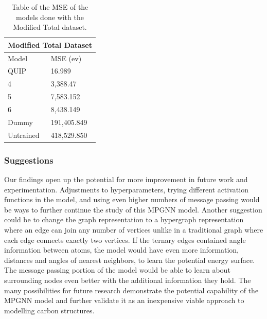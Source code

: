 \documentclass[12pt, abstract = true]{scrartcl}
\begin{document}
\begin{table}
    \centering
    \begin{tabular}{p{3cm}|p{2.5cm}}
    \hline
    \multicolumn{2}{|c|}{Modified Total Dataset} \\
    \hline
    Model  & MSE (ev)\\
    \hline
    QUIP   & 16.989 \\
    4   & 3,388.47 \\
    5 & 7,583.152 \\
    6    & 8,438.149\\
    Dummy & 191,405.849 \\
    Untrained & 418,529.850\\
    \hline
    \end{tabular}
    \caption{Table of the MSE of the models done with the Modified Total dataset.}\label{tab:total}
\end{table}


\subsubsection{Suggestions} 

Our findings open up the potential for more improvement in future work and experimentation. Adjustments to hyperparameters, trying different activation functions in the model, and using even higher numbers of message passing would be ways to further continue the study of this MPGNN model. Another suggestion could be to change the graph representation to a hypergraph representation where an edge can join any number of vertices unlike in a traditional graph where each edge connects exactly two vertices. If the ternary edges contained angle information between atoms, the model would have even more information, distances and angles of nearest neighbors, to learn the potential energy surface. The message passing portion of the model would be able to learn about surrounding nodes even better with the additional information they hold. The many possibilities for future research demonstrate the potential capability of the MPGNN model and further validate it as an inexpensive viable approach to modelling carbon structures.


\newpage



\end{document}

